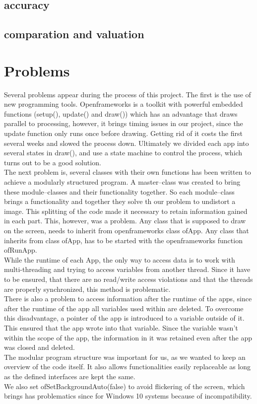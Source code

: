 \documentclass[journal,final,a4paper,twoside]{PS}
\begin{document}
\subsection{accuracy}
\subsection{comparation and valuation}

\section{Problems}
\label{sec:probs}
Several problems appear during the process of this project.
The first is the use of new programming tools. Openframeworks is a toolkit with powerful embedded functions (setup(), update() and draw()) which has an advantage that draws parallel to processing, however, it brings timing issues in our project, since the update function only runs once before drawing. Getting rid of it costs the first several weeks and slowed the process down. Ultimately we divided each app into several states in draw(), and use a state machine to control the process, which turns out to be a good solution.  \\
The next problem is, several classes with their own functions has been written to achieve a modularly structured program. A  master--class was created to bring these module--classes and their functionality together. So each module--class brings a functionality and together they solve th our problem to undistort a image. This splitting of the code made it necessary to retain information gained in each part. This, however, was a problem. Any class that is supposed to draw on the screen, needs to inherit from openframeworks class ofApp. Any class that inherits from class ofApp, has to be started with the openframeworks function ofRunApp.\\
While the runtime of each App, the only way to access data is to work with multi-threading and trying to access variables from another thread. Since it have to be ensured, that there are no read/write access violations and that the threads are properly synchronized, this method is problematic. \\
There is also a problem to access information after the runtime of the apps, since after the runtime of the app all variables used within are deleted. To overcome this disadvantage, a pointer of the app is introduced to a variable outside of it. This ensured that the app wrote into that variable. Since the variable wasn't within the scope of the app, the information in it was retained even after the app was closed and deleted.\\
The modular program structure was important for us, as we wanted to keep an overview of the code itself. It also allows functionalities easily replaceable as long as the defined interfaces are kept the same.
\\
We also set ofSetBackgroundAuto(false) to avoid flickering of the screen, which brings has problematics since for Windows 10 systems because of incompatibility. 
\end{document}
